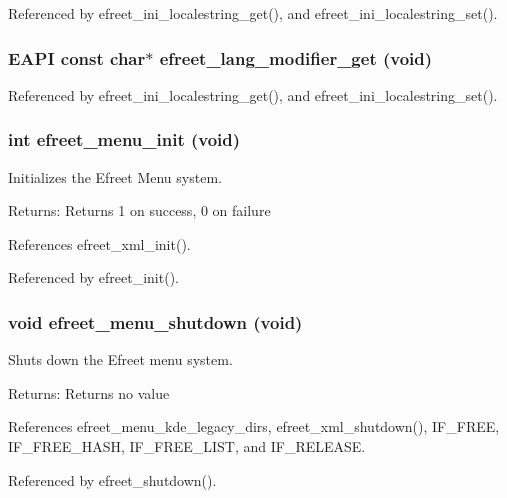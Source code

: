 Referenced by efreet\_\-ini\_\-localestring\_\-get(), and efreet\_\-ini\_\-localestring\_\-set().
\subsubsection[efreet\_\-lang\_\-modifier\_\-get]{\setlength{\rightskip}{0pt plus 5cm}EAPI const char$\ast$ efreet\_\-lang\_\-modifier\_\-get (void)}\label{group__Efreet__Private_gc05963610edfe32f48fcbf0b67788e89}




Referenced by efreet\_\-ini\_\-localestring\_\-get(), and efreet\_\-ini\_\-localestring\_\-set().
\subsubsection[efreet\_\-menu\_\-init]{\setlength{\rightskip}{0pt plus 5cm}int efreet\_\-menu\_\-init (void)}\label{group__Efreet__Private_g0f181489fc48b11061742f56a19f0433}


Initializes the Efreet Menu system. 

\begin{Desc}
\item[Returns:]Returns 1 on success, 0 on failure \end{Desc}


References efreet\_\-xml\_\-init().

Referenced by efreet\_\-init().
\subsubsection[efreet\_\-menu\_\-shutdown]{\setlength{\rightskip}{0pt plus 5cm}void efreet\_\-menu\_\-shutdown (void)}\label{group__Efreet__Private_g55e7c0143864a3508da749a7986283f4}


Shuts down the Efreet menu system. 

\begin{Desc}
\item[Returns:]Returns no value \end{Desc}


References efreet\_\-menu\_\-kde\_\-legacy\_\-dirs, efreet\_\-xml\_\-shutdown(), IF\_\-FREE, IF\_\-FREE\_\-HASH, IF\_\-FREE\_\-LIST, and IF\_\-RELEASE.

Referenced by efreet\_\-shutdown().